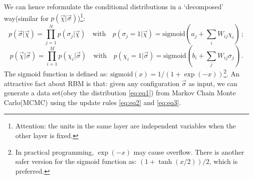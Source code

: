 \documentclass[letterpaper, 10pt]{article}
\begin{document}
We can hence reformulate the conditional distributions in a `decomposed' way(similar for $p(\vec{\chi}|\vec{\sigma})$)\footnote{Attention: the units in the same layer are independent variables when the other layer is fixed.}:
\begin{equation}
p(\vec{\sigma}|\vec{\chi}) = \prod_{j=1}^{N} p(\sigma_j | \vec{\chi}) \quad{} \mathrm{with} \quad{} p(\sigma_j=1 | \vec{\chi}) = \mathrm{sigmoid}(a_j + \sum_i W_{ij}\chi_i)\,; \label{eq:eq2}
\end{equation}
\begin{equation}
p(\vec{\chi}|\vec{\sigma}) = \prod_{i=1}^{M} p(\chi_i | \vec{\sigma}) \quad{} \mathrm{with} \quad{} p(\chi_i=1 | \vec{\sigma}) = \mathrm{sigmoid}(b_i + \sum_j W_{ij}\sigma_j)\,.\label{eq:eq3}
\end{equation}
The sigmoid function is defined as: $\mathrm{sigmoid}(x) = 1/(1+\exp{(-x)})$\footnote{In practical programming, $\exp(-x)$ may cause overflow. There is another safer version for the sigmoid function as: $(1+\tanh{(x/2)})/2$, which is preferred.}. An attractive fact about RBM is that: given any configuration $\vec{\sigma}$ as input, we can generate a data set(obey the distribution \ref{eq:eq1}) from Markov Chain Monte Carlo(MCMC) using the update rules \ref{eq:eq2} and \ref{eq:eq3}.
\end{document}
